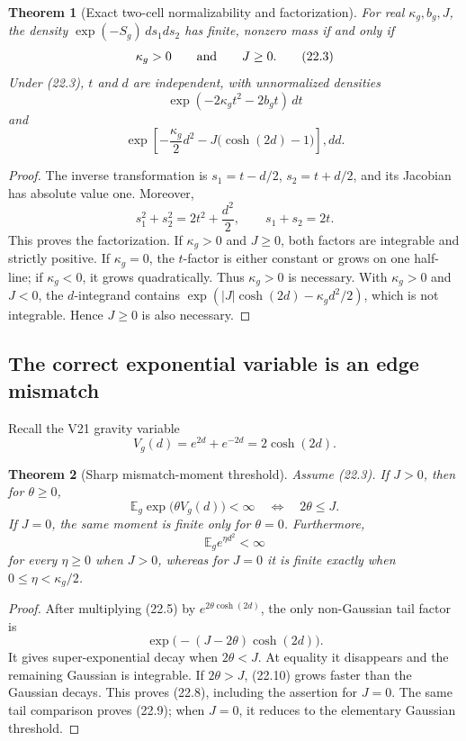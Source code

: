 \documentclass[11pt]{article}
\newtheorem{theorem}{Theorem}[section]
\theoremstyle{remark}
\begin{document}
\begin{theorem}[Exact two-cell normalizability and factorization]
\label{thm:v17v22-factor}
For real \(\kappa_g,b_g,J\), the density
\(\exp(-S_g)\,ds_1ds_2\) has finite, nonzero mass if and only if
\[
 \kappa_g>0\qquad\hbox{and}\qquad J\geq0.           \tag{22.3}
\]
Under (22.3), \(t\) and \(d\) are independent, with unnormalized
densities
\[
 \exp(-2\kappa_gt^2-2b_gt)\,dt                     \tag{22.4}
\]
and
\[
 \exp\left[-\frac{\kappa_g}{2}d^2
 -J\bigl(\cosh(2d)-1\bigr)\right],dd.             \tag{22.5}
\]
\end{theorem}

\begin{proof}
The inverse transformation is
\(s_1=t-d/2\), \(s_2=t+d/2\), and its Jacobian has absolute value one.
Moreover,
\[
 s_1^2+s_2^2=2t^2+\frac{d^2}{2},
 \qquad s_1+s_2=2t.                                \tag{22.6}
\]
This proves the factorization.  If \(\kappa_g>0\) and \(J\geq0\),
both factors are integrable and strictly positive.  If
\(\kappa_g=0\), the \(t\)-factor is either constant or grows on one
half-line; if \(\kappa_g<0\), it grows quadratically.  Thus
\(\kappa_g>0\) is necessary.  With \(\kappa_g>0\) and \(J<0\), the
\(d\)-integrand contains
\(\exp(|J|\cosh(2d)-\kappa_gd^2/2)\), which is not integrable.
Hence \(J\geq0\) is also necessary.
\end{proof}

\subsection{The correct exponential variable is an edge mismatch}

Recall the V21 gravity variable
\[
 V_g(d)=e^{2d}+e^{-2d}=2\cosh(2d).                 \tag{22.7}
\]

\begin{theorem}[Sharp mismatch-moment threshold]
\label{thm:v17v22-mismatch}
Assume (22.3).  If \(J>0\), then for \(\theta\geq0\),
\[
 \mathbb E_g\exp\bigl(\theta V_g(d)\bigr)<\infty
 \quad\Longleftrightarrow\quad 2\theta\leq J.     \tag{22.8}
\]
If \(J=0\), the same moment is finite only for \(\theta=0\).
Furthermore,
\[
 \mathbb E_g e^{\eta d^2}<\infty                  \tag{22.9}
\]
for every \(\eta\geq0\) when \(J>0\), whereas for \(J=0\) it is
finite exactly when \(0\leq\eta<\kappa_g/2\).
\end{theorem}

\begin{proof}
After multiplying (22.5) by \(e^{2\theta\cosh(2d)}\), the only
non-Gaussian tail factor is
\[
 \exp\bigl(-(J-2\theta)\cosh(2d)\bigr).            \tag{22.10}
\]
It gives super-exponential decay when \(2\theta<J\).  At equality it
disappears and the remaining Gaussian is integrable.  If
\(2\theta>J\), (22.10) grows faster than the Gaussian decays.  This
proves (22.8), including the assertion for \(J=0\).  The same tail
comparison proves (22.9); when \(J=0\), it reduces to the elementary
Gaussian threshold.
\end{proof}
\end{document}
